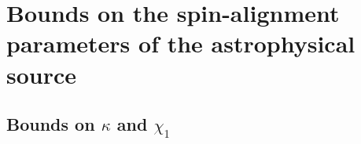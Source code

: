 
\chapter{Bounds on the spin-alignment parameters of the astrophysical source}
\section{Bounds on $\kappa$ and $\chi_1$}

